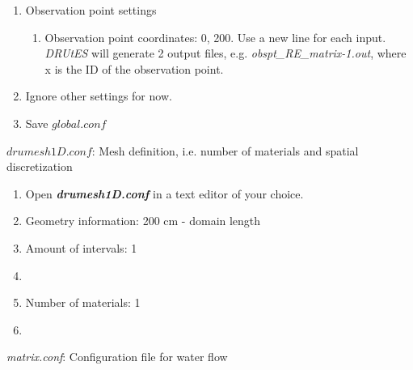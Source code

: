 \begin{enumerate}
\begin{enumerate}
\end{enumerate}
\item Observation point settings \begin{enumerate}
\item Observation point coordinates: 0, 200. Use a new line for each input. \textit{DRUtES} will generate 2 output files, e.g. \textit{obspt\_RE\_matrix-1.out}, where x is the ID of the observation point. 
\end{enumerate}
\item Ignore other settings for now. 
\item Save $global.conf$
\end{enumerate}


$drumesh1D.conf$: Mesh definition, i.e. number of materials and spatial discretization
\begin{enumerate}
\item Open \textbf{\emph{drumesh1D.conf}} in a text editor of your choice. 
\item Geometry information: 200 cm - domain length
\item Amount of intervals: 1
\item
{}
\item Number of materials: 1
\item {}
\end{enumerate}

\emph{matrix.conf}: Configuration file for water flow 


